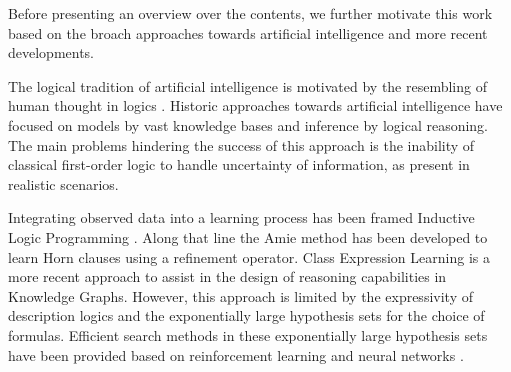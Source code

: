 
Before presenting an overview over the contents, we further motivate this work based on the broach approaches towards artificial intelligence and more recent developments.


The logical tradition of artificial intelligence is motivated by the resembling of human thought in logics \cite{mccarthy_programs_1959}.
Historic approaches towards artificial intelligence have focused on models by vast knowledge bases and inference by logical reasoning.
The main problems hindering the success of this approach is the inability of classical first-order logic to handle uncertainty of information, as present in realistic scenarios.

Integrating observed data into a learning process has been framed Inductive Logic Programming \cite{muggleton_inductive_1994}.
Along that line the Amie method \cite{galarraga_amie_2013} has been developed to learn Horn clauses using a refinement operator.
Class Expression Learning \cite{lehmann_class_2011} is a more recent approach to assist in the design of reasoning capabilities in Knowledge Graphs.
However, this approach is limited by the expressivity of description logics and the exponentially large hypothesis sets for the choice of formulas.
Efficient search methods in these exponentially large hypothesis sets have been provided based on reinforcement learning \cite{demir_drill-_2021} and neural networks \cite{kouagou_neural_2022, pesquita_neural_2023}.

